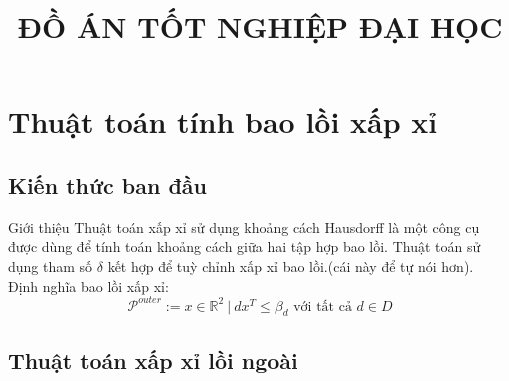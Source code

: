 \documentclass[11pt]{beamer}
\title[ \footnotesize  \textcolor{red}{\bf Đồ án tốt nghiệp} -- \textcolor{blue}{Trần Xuân Độ }]{\Large  \bf ĐỒ ÁN TỐT NGHIỆP ĐẠI HỌC}
\institute{\bf  Hà Nội, tháng 12 năm 2023}
\theoremstyle{definition}
\theoremstyle{plain}
\theoremstyle{plain}
\theoremstyle{remark}
\begin{document}
	\frame[plain]{%
			\titlepage{}
		}

	\section{Thuật toán tính bao lồi xấp xỉ}
	\subsection{Kiến thức ban đầu}
	\begin{frame}{Giới thiệu}
		Thuật toán xấp xỉ sử dụng khoảng cách Hausdorff là một công cụ được dùng để tính toán khoảng cách giữa hai tập hợp bao lồi.
		Thuật toán sử dụng tham số $\delta$ kết hợp để tuỳ chỉnh xấp xỉ bao lồi.(cái này để tự nói hơn).\\
			Định nghĩa bao lồi xấp xỉ:
		\begin{equation}
			\mathcal{P}^{outer} := {x \in \mathbb{R}^2 \ | \ d x^T \leq \beta_d \text{ với tất cả } d \in D}
		\end{equation}
	\end{frame}	
		\subsection{Thuật toán xấp xỉ lồi ngoài}
\end{document}
